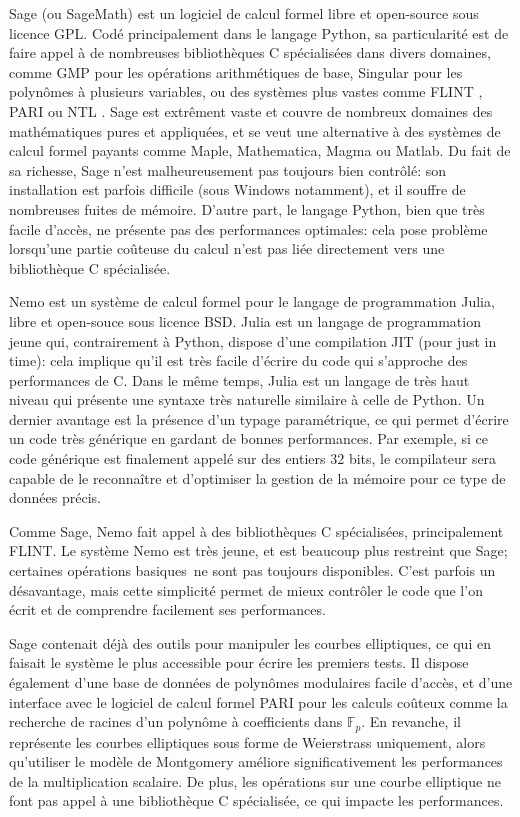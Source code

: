 \documentclass[11pt,a4paper]{article}
\newcommand{\F}{\mathbb{F}}
\renewcommand{\v}{\vspace{5mm}}
\theoremstyle{definition}
\begin{document}
Sage (ou SageMath) est un logiciel de calcul formel libre et open-source sous licence GPL. Codé principalement dans le langage Python, sa particularité est de faire appel à de nombreuses bibliothèques C spécialisées dans divers domaines, comme GMP \cite{GMP} pour les opérations arithmétiques de base, Singular pour les polynômes à plusieurs variables, ou des systèmes plus vastes comme FLINT \cite{FLINT}, PARI \cite{PARI} ou NTL \cite{NTL}. Sage est extrêment vaste et couvre de nombreux domaines des mathématiques pures et appliquées, et se veut une alternative à des systèmes de calcul formel payants comme Maple, Mathematica, Magma ou Matlab. Du fait de sa richesse, Sage n'est malheureusement pas toujours bien contrôlé: son installation est parfois difficile (sous Windows notamment), et il souffre de nombreuses fuites de mémoire. D'autre part, le langage Python, bien que très facile d'accès, ne présente pas des performances optimales: cela pose problème lorsqu'une partie coûteuse du calcul n'est pas liée directement vers une bibliothèque C spécialisée.

Nemo est un système de calcul formel pour le langage de programmation Julia, libre et open-souce sous licence BSD. Julia est un langage de programmation jeune qui, contrairement à Python, dispose d'une compilation JIT (pour \og just in time\fg): cela implique qu'il est très facile d'écrire du code qui s'approche des performances de C. Dans le même temps, Julia est un langage de très haut niveau qui présente une syntaxe très naturelle similaire à celle de Python. Un dernier avantage est la présence d'un typage paramétrique, ce qui permet d'écrire un code très générique en gardant de bonnes performances. Par exemple, si ce code générique est finalement appelé sur des entiers 32 bits, le compilateur sera capable de le reconnaître et d'optimiser la gestion de la mémoire pour ce type de données précis.

Comme Sage, Nemo fait appel à des bibliothèques C spécialisées, principalement FLINT. Le système Nemo est très jeune, et est beaucoup plus restreint que Sage; certaines opérations \og basiques\fg\ ne sont pas toujours disponibles. C'est parfois un désavantage, mais cette simplicité permet de mieux contrôler le code que l'on écrit et de comprendre facilement ses performances.

\v
Sage contenait déjà des outils pour manipuler les courbes elliptiques, ce qui en faisait le système le plus accessible pour écrire les premiers tests. Il dispose également d'une base de données de polynômes modulaires facile d'accès, et d'une interface avec le logiciel de calcul formel PARI pour les calculs coûteux comme la recherche de racines d'un polynôme à coefficients dans $\F_p$. En revanche, il représente les courbes elliptiques sous forme de Weierstrass uniquement, alors qu'utiliser le modèle de Montgomery améliore significativement les performances de la multiplication scalaire. De plus, les opérations sur une courbe elliptique ne font pas appel à une bibliothèque C spécialisée, ce qui impacte les performances. 
\end{document}
